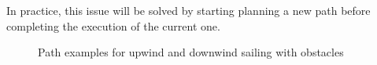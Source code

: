 In practice, this issue will be solved by starting planning a new path before
completing the execution of the current one.


\begin{figure}[htb]
  \centering
  \hspace{1cm}
  \caption{Path examples for upwind and downwind sailing with obstacles}
  \label{fig:navi_path}
\end{figure}
